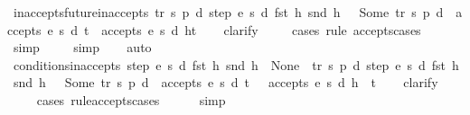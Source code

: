 \begin{isabellebody}
\endisatagproof
{\isafoldproof}%
%
\isadelimproof
\isanewline
%
\endisadelimproof
\isanewline
{}\isamarkupfalse%
\ inaccepts{\isacharunderscore}future{\isacharunderscore}inaccepts{\isacharcolon}\ {\isachardoublequoteopen}{\isacharparenleft}{\isasymexists}tr\ s{\isacharprime}\ p{\isacharprime}\ d{\isacharprime}{\isachardot}\ step\ e\ s\ d\ {\isacharparenleft}fst\ h{\isacharparenright}\ {\isacharparenleft}snd\ h{\isacharparenright}\ {\isacharequal}\ \ Some\ {\isacharparenleft}tr{\isacharcomma}\ s{\isacharprime}{\isacharcomma}\ p{\isacharprime}{\isacharcomma}\ d{\isacharprime}{\isacharparenright}\ {\isasymand}\ {\isasymnot}accepts\ e\ s{\isacharprime}\ d{\isacharprime}\ t{\isacharparenright}\ {\isasymLongrightarrow}\ {\isasymnot}accepts\ e\ s\ d\ {\isacharparenleft}h{\isacharhash}t{\isacharparenright}{\isachardoublequoteclose}\isanewline
%
\isadelimproof
\ \ %
\endisadelimproof
%
\isatagproof
{}\isamarkupfalse%
\ clarify\isanewline
\ \ \ \ \isamarkupfalse%
{\isacharparenleft}cases\ rule{\isacharcolon}\ accepts{\isachardot}cases{\isacharparenright}\isanewline
\ \ \ \ \isamarkupfalse%
\ simp\isanewline
\ \ \ \isamarkupfalse%
\ simp\isanewline
\ \ \isamarkupfalse%
\ auto%
\endisatagproof
{\isafoldproof}%
%
\isadelimproof
\isanewline
%
\endisadelimproof
\isanewline
{}\isamarkupfalse%
\ conditions{\isacharunderscore}inaccepts{\isacharcolon}\ {\isachardoublequoteopen}step\ e\ s\ d\ {\isacharparenleft}fst\ h{\isacharparenright}\ {\isacharparenleft}snd\ h{\isacharparenright}\ {\isacharequal}\ None\ {\isasymor}\ {\isacharparenleft}{\isasymexists}tr\ s{\isacharprime}\ p{\isacharprime}\ d{\isacharprime}{\isachardot}\ step\ e\ s\ d\ {\isacharparenleft}fst\ h{\isacharparenright}\ {\isacharparenleft}snd\ h{\isacharparenright}\ {\isacharequal}\ \ Some\ {\isacharparenleft}tr{\isacharcomma}\ s{\isacharprime}{\isacharcomma}\ p{\isacharprime}{\isacharcomma}\ d{\isacharprime}{\isacharparenright}\ {\isasymand}\ {\isasymnot}accepts\ e\ s{\isacharprime}\ d{\isacharprime}\ t{\isacharparenright}\ {\isasymLongrightarrow}\ {\isasymnot}\ accepts\ e\ s\ d\ {\isacharparenleft}h\ {\isacharhash}\ t{\isacharparenright}{\isachardoublequoteclose}\isanewline
%
\isadelimproof
\ \ %
\endisadelimproof
%
\isatagproof
{}\isamarkupfalse%
\ clarify\isanewline
\ \ \ \ \isamarkupfalse%
{\isacharparenleft}cases\ rule{\isacharcolon}accepts{\isachardot}cases{\isacharparenright}\isanewline
\ \ \ \ \isamarkupfalse%
\ simp\isanewline
\ \ \ \isamarkupfalse%

\end{isabellebody}
